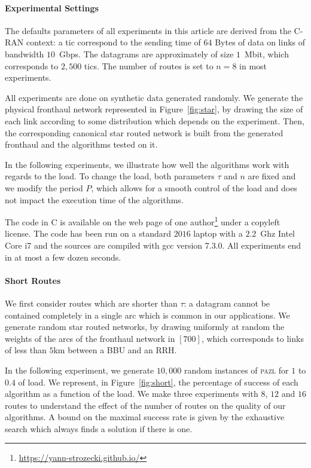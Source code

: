 \documentclass[a4paper,10pt]{journal}
\newcommand\pazl{\textsc{pazl}\xspace}
\begin{document}
   \paragraph{Experimental Settings}


     The defaults parameters of all experiments in this article are derived from the C-RAN context: a tic correspond to the sending time of $64$ Bytes of data on links of bandwidth $10$~Gbps. The datagrams are approximately of size $1$~Mbit, which corresponds to $2,500$ tics. The number of routes is set to $n = 8$ in most experiments. 

     All experiments are done on synthetic data generated randomly. We generate the physical fronthaul
     network represented in Figure~\ref{fig:star}, by drawing the size of each link according 
     to some distribution which depends on the experiment. Then, the corresponding canonical star routed network is built from the generated fronthaul and the algorithms tested on it. 

     In the following experiments, we illustrate how well the algorithms work with regards to the load. To change the load, both parameters $\tau$ and $n$ are fixed and we modify the period $P$, which allows for a smooth control of the load and does not impact the execution time of the algorithms.

     The code in C is available on the web page of one author\footnote{\url{https://yann-strozecki.github.io/}} under a copyleft license. The code has been run on a standard $2016$ laptop with a $2.2$~Ghz Intel Core i7 and the sources are compiled with gcc version 7.3.0. All experiments end in at most a few dozen seconds.

    \paragraph{Short Routes}
      
    

 	 We first consider routes which are shorter than $\tau$: a datagram cannot be contained completely in a single arc which is common in our applications. We generate random star routed networks, by drawing uniformly at random the weights of the arcs of the fronthaul network in $[700]$, which corresponds to links of less than $5$km between a BBU and an RRH.

     In the following experiment, we generate $10,000$ random instances of \pazl for $1$ to $0.4$ of load. We represent, in Figure~\ref{fig:short}, the percentage of success of each algorithm as a function of the load. We make three experiments with $8$, $12$ and $16$ routes to understand the effect of the number of routes on the quality of our algorithms. A bound on the maximal success rate is given by the exhaustive search which always finds a solution if there is one. 
       
\end{document}

